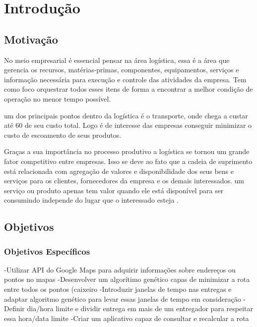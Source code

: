 
\chapter[Introdução]{Introdução}

\section{Motivação}

No meio empresarial é essencial pensar na área logística, essa é a área que gerencia os recursos,
matérias-primas, componentes, equipamentos, serviços e informação necessária para execução e 
controle das atividades da empresa. Tem como foco orquestrar todos esses itens de forma a encontrar
a melhor condição de operação no menor tempo possível. \cite{DIAS}

um dos principais pontos dentro da logística é o transporte, onde chega a custar até 60%
de seu custo total.\cite{RODRIGUES} Logo é de interesse das empresas conseguir minimizar o custo de escoamento de seus produtos.

Graças a sua importância no processo produtivo a logística se tornou um grande fator competitivo entre empresas.
Isso se deve ao fato que a cadeia de suprimento está relacionada com agregação de valores e disponibilidade dos seus bens e
serviços para os clientes, fornecedores da empresa e os demais interessados. um serviço ou produto apenas tem valor quando 
ele está disponível para ser consumindo independe do lugar que o interessado esteja \cite{TSUDA}.

\section{Objetivos}



\subsection{Objetivos Específicos}
-Utilizar API do Google Maps para adquirir informações sobre endereços ou pontos no mapas
-Desenvolver um algorítimo genético capas de minimizar a rota entre todos os pontos (caixeiro
-Introduzir janelas de tempo nas entregas e adaptar algoritmo genético para levar essas janelas de tempo em consideração
-Definir dia/hora limite e dividir entrega em mais de um entregador para respeitar essa hora/data limite
-Criar um aplicativo capaz de consultar e recalcular a rota


